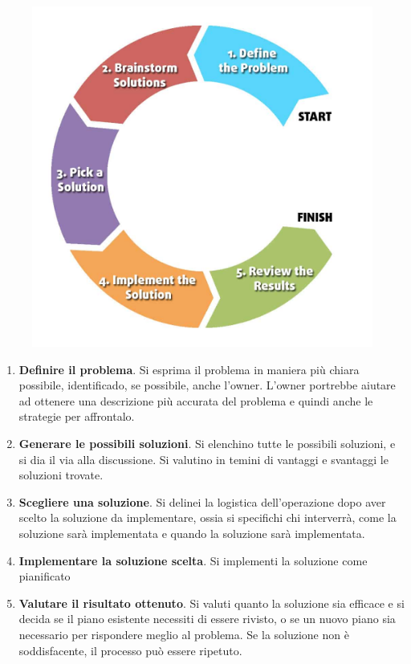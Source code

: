 \documentclass{article}
\begin{document}
\begin{figure}[h]
    \centering
    \includegraphics[scale=0.25]{./imgs/Problem-Solving-Cycle.jpg}
    \label{Problem Solving Cycle}
\end{figure}

\begin{enumerate}
    \item \textbf{Definire il problema}. Si esprima il problema in maniera più chiara possibile, identificado, se possibile, anche l'owner.
    L'owner portrebbe aiutare ad ottenere una descrizione più accurata del problema e quindi 
    anche le strategie per affrontalo.
    \item \textbf{Generare le possibili soluzioni}. Si elenchino tutte le possibili soluzioni, e si dia il via alla discussione.
    Si valutino in temini di vantaggi e svantaggi le soluzioni trovate. 
    \item \textbf{Scegliere una soluzione}. Si delinei la logistica dell'operazione dopo aver scelto la soluzione da implementare, ossia
    si specifichi chi interverrà, come la soluzione sarà implementata e quando la soluzione sarà implementata.
    \item \textbf{Implementare la soluzione scelta}. Si implementi la soluzione come pianificato
    \item \textbf{Valutare il risultato ottenuto}. Si valuti quanto la soluzione sia efficace e si decida se il piano esistente necessiti di essere rivisto, 
    o se un nuovo piano sia necessario per rispondere meglio al problema. 
    Se la soluzione non è soddisfacente, il processo può essere ripetuto.     
\end{enumerate}
\end{document}
